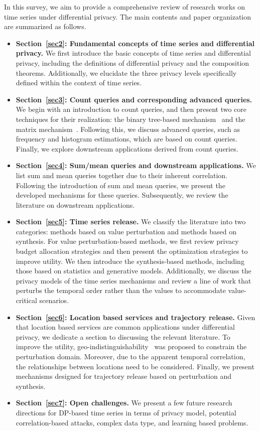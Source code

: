 In this survey, we aim to provide a comprehensive review of research works on time series under differential privacy. The main contents and paper organization are summarized as follows.
\begin{itemize}
	\item \textbf{Section~\ref{sec2}: Fundamental concepts of time series and differential privacy.} We first introduce the basic concepts of time series and differential privacy, including the definitions of differential privacy and the composition theorems. Additionally, we elucidate the three privacy levels specifically defined within the context of time series.
	\item \textbf{Section~\ref{sec3}: Count queries and corresponding advanced queries.} We begin with an introduction to count queries, and then present two core techniques for their realization: the binary tree-based mechanism~\cite{chan2011private} and the matrix mechanism~\cite{li2015matrix}. Following this, we discuss advanced queries, such as frequency and histogram estimations, which are based on count queries. Finally, we explore downstream applications derived from count queries.
	\item \textbf{Section~\ref{sec4}: Sum/mean queries and downstream applications.} We list sum and mean queries together  due to their inherent correlation. Following the introduction of sum and mean queries, we present the developed mechanisms for these queries. Subsequently, we review the literature on downstream applications.
	\item \textbf{Section~\ref{sec5}: Time series release.} We classify the literature into two categories: methods based on value perturbation and  methods based on synthesis. For value perturbation-based methods, we first review  privacy budget allocation strategies and then present the optimization strategies to improve utility. We then  introduce the synthesis-based methods, including those based on statistics and generative models. Additionally, we discuss the privacy models of the time series mechanisms and review a line of work that perturbs the temporal order rather than the values to accommodate value-critical scenarios.
	\item \textbf{Section~\ref{sec6}: Location based services and trajectory release.} Given that location based services are common applications under differential privacy, we dedicate a section to discussing the relevant literature.  To improve the utility, geo-indistinguishability~\cite{andres2013geo} was proposed to constrain the perturbation domain. Moreover, due to the apparent temporal correlation, the relationships between locations need to be considered. Finally, we present mechanisms designed for trajectory release based on perturbation and synthesis.
    \item \textbf{Section~\ref{sec7}: Open challenges.} We present a few future research directions for DP-based time series in terms of privacy model, potential correlation-based attacks, complex data type, and learning based problems.
\end{itemize}




